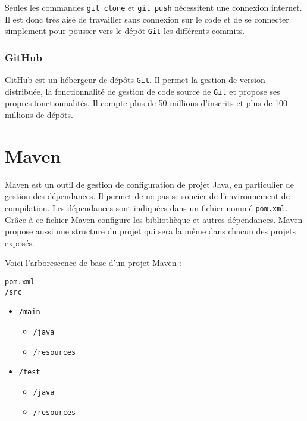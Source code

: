 Seules les commandes \texttt{git clone} et  \texttt{git push} nécessitent une connexion internet. Il est donc très aisé de travailler sans connexion sur le code et de se connecter simplement pour pousser vers le dépôt \texttt{Git} les différents commits.

\subsubsection*{GitHub \href{https://github.com/barnabegeffroy}{\faGithub}}
GitHub est un hébergeur de dépôts \texttt{Git}. Il permet la gestion de version distribuée, la fonctionnalité de gestion de code source de \texttt{Git} et propose ses propres fonctionnalités. Il compte plus de 50 millions d'inscrits et plus de 100 millions de dépôts.

\section*{Maven}
Maven est un outil de gestion de configuration de projet Java, en particulier de gestion des dépendances. Il permet de ne pas se soucier de l’environnement de compilation. Les dépendances sont indiquées dans un fichier nommé \texttt{pom.xml}. Grâce à ce fichier Maven configure les bibliothèque et autres dépendances. Maven propose aussi une structure du projet qui sera la même dans chacun des projets exposés. 

Voici l'arborescence de base d'un projet Maven :
\begin{center}
    \begin{minipage}[t]{3.5cm}
        \texttt{pom.xml}\\
        \texttt{/src}
        \begin{itemize}
            \item[] \texttt{/main}
                  \begin{itemize}
                      \item[] \texttt{/java}
                  \end{itemize}\vspace{-0.8ex}
                  \begin{itemize}
                      \item[] \texttt{/resources}
                  \end{itemize}\vspace{-0.8ex}
            \item[] \texttt{/test}
                  \begin{itemize}
                      \item[] \texttt{/java}
                  \end{itemize}\vspace{-0.8ex}
                  \begin{itemize}
                      \item[] \texttt{/resources}
                  \end{itemize}\vspace{-0.8ex}
        \end{itemize}
    \end{minipage}\hfill%
\end{center}